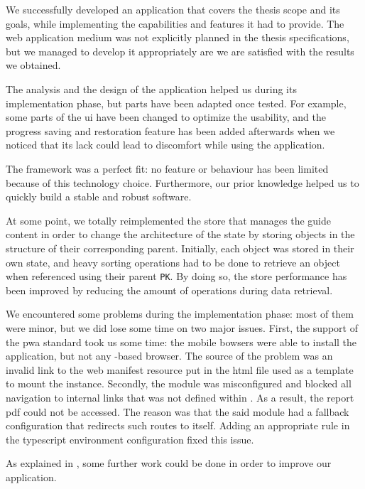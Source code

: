 We successfully developed an application that covers the thesis scope and its goals, while implementing the capabilities and features it had to provide. The web application medium was not explicitly planned in the thesis specifications, but we managed to develop it appropriately are we are satisfied with the results we obtained.

The analysis and the design of the application helped us during its implementation phase, but parts have been adapted once tested. For example, some parts of the \gls{ui} have been changed to optimize the usability, and the progress saving and restoration feature has been added afterwards when we noticed that its lack could lead to discomfort while using the application.

The  \gls{framework} was a perfect fit: no feature or behaviour has been limited because of this technology choice. Furthermore, our prior knowledge helped us to quickly build a stable and robust software.

At some point, we totally reimplemented the  store that manages the guide content in order to change the architecture of the state by storing objects in the structure of their corresponding parent. Initially, each object was stored in their own state, and heavy sorting operations had to be done to retrieve an object when referenced using their parent \texttt{PK}. By doing so, the store performance has been improved by reducing the amount of operations during data retrieval.

We encountered some problems during the implementation phase: most of them were minor, but we did lose some time on two major issues. First, the support of the \gls{pwa} standard took us some time: the  mobile bowsers were able to install the application, but not any -based browser. The source of the problem was an invalid link to the web manifest resource put in the \gls{html} file used as a template to mount the  instance. Secondly, the  module was misconfigured and blocked all navigation to internal links that was not defined within . As a result, the report \gls{pdf} could not be accessed. The reason was that the said module had a fallback configuration that redirects such routes to itself. Adding an appropriate rule in the \gls{typescript} environment configuration fixed this issue.

As explained in , some further work could be done in order to improve our application.